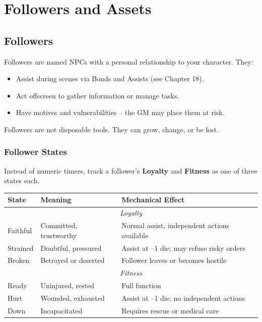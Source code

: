 \section{Followers and Assets}
\label{sec:followers-assets}

\subsection{Followers}
Followers are named NPCs with a personal relationship to your character. They:
\begin{itemize}
  \item Assist during scenes via Bonds and Assists (see Chapter 18).
  \item Act offscreen to gather information or manage tasks.
  \item Have motives and vulnerabilities -- the GM may place them at risk.
\end{itemize}
Followers are not disposable tools. They can grow, change, or be lost.

\subsubsection{Follower States}
Instead of numeric timers, track a follower's \textbf{Loyalty} and \textbf{Fitness} as one of three states each.

\begin{center}
\small
\begin{tabular}{lll}
\toprule
\textbf{State} & \textbf{Meaning} & \textbf{Mechanical Effect} \\
\midrule
\multicolumn{3}{c}{\textit{Loyalty}} \\
Faithful & Committed, trustworthy & Normal assist, independent actions available \\
Strained & Doubtful, pressured & Assist at --1 die; may refuse risky orders \\
Broken & Betrayed or deserted & Follower leaves or becomes hostile \\
\midrule
\multicolumn{3}{c}{\textit{Fitness}} \\
Ready & Uninjured, rested & Full function \\
Hurt & Wounded, exhausted & Assist at --1 die; no independent actions \\
Down & Incapacitated & Requires rescue or medical care \\
\bottomrule
\end{tabular}
\end{center}

